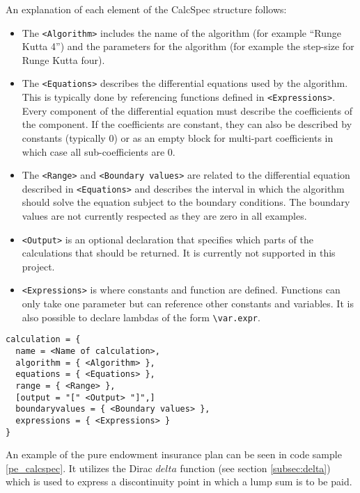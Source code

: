An explanation of each element of the CalcSpec structure follows:
\begin{itemize}
\item The \lstinline$<Algorithm>$ includes the name of the algorithm (for example ``Runge Kutta 4'') and the parameters for the algorithm (for example the step-size for Runge Kutta four).
\item The \lstinline$<Equations>$ describes the differential equations used by the algorithm. This is typically done by referencing functions defined in \lstinline$<Expressions>$. Every component of the differential equation must describe the coefficients of the component. If the coefficients are constant, they can also be described by constants (typically 0) or as an empty block for multi-part coefficients in which case all sub-coefficients are 0.
\item The \lstinline$<Range>$ and \lstinline$<Boundary values>$ are related to the differential equation described in \lstinline$<Equations>$ and describes the interval in which the algorithm should solve the equation subject to the boundary conditions. The boundary values are not currently respected as they are zero in all examples.
\item \lstinline$<Output>$ is an optional declaration that specifies which parts of the calculations that should be returned. It is currently not supported in this project. %
\item \lstinline$<Expressions>$ is where constants and function are defined. Functions can only take one parameter but can reference other constants and variables. It is also possible to declare lambdas of the form \lstinline$\var.expr$.
\end{itemize}

\begin{lstlisting}[caption=CalcSpec structure, label=calcspecstructure, language=calcspec]
calculation = {
  name = <Name of calculation>,
  algorithm = { <Algorithm> },
  equations = { <Equations> },
  range = { <Range> },
  [output = "[" <Output> "]",]
  boundaryvalues = { <Boundary values> },
  expressions = { <Expressions> }
}
\end{lstlisting}

An example of the pure endowment insurance plan can be seen in code sample \ref{pe_calcspec}. 
It utilizes the Dirac $delta$ function\cite{hassani2009dirac} (see section \ref{subsec:delta}) which is used to express a discontinuity point in which a lump sum is to be paid.


